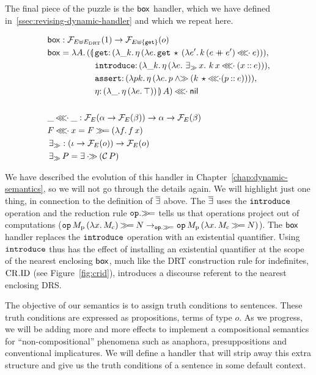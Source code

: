 The final piece of the puzzle is the $\mathsf{box}$ handler, which we have defined
in~\ref{ssec:revising-dynamic-handler} and which we repeat here.

\begin{align*}
  &\BOX :\FF_{E \uplus E_\DRT}(1) \to \FF_{E \uplus \{\op{get}\}}(o) \\
  &\BOX = \lam{A}{(\ap{\begin{aligned}[t]\lban
  &\onto{\op{get}}{(\lam{\_ k}{\etaE{(\lam{e}{\app{\op{get}}{\star}{(\lam{e'}{\ap{k}{(e \cat e')} \apll e})}})}})}, \\
  &\onto{\op{introduce}}{(\lam{\_ k}{\etaE{(\lam{e}{\existsr x.\ \ap{k}{x} \apll (x \cons e)})}})}, \\
  &\onto{\op{assert}}{(\lam{p k}{\etaE{(\lam{e}{p \andr (\ap{k}{\star} \apll (p \cons e))})}})}, \\
  &\onto{\eta}{(\lam{\_}{\etaE{(\lam{e}{\top})}})}\rban}{A}) \apll \nil
    \end{aligned}} \\
  \\
  &\_ \apll \_ : \FF_E(\alpha \to \FF_E(\beta)) \to \alpha \to \FF_E(\beta) \\
  &F \apll x = F \hsbind (\lam{f}{\ap{f}{x}}) \\
  &\existsr : (\iota \to \FF_E(o)) \to  \FF_E(o) \\
  &\existsr P = \exists \apr (\ap{\CC}{P})
\end{align*}

We have described the evolution of this handler in
Chapter~\ref{chap:dynamic-semantics}, so we will not go through the details
again. We will highlight just one thing, in connection to the definition of
$\mathop{\overline{\exists}}$ above. The $\mathop{\overline{\exists}}$ uses the $\mathtt{introduce}$ operation and
the reduction rule $\mathtt{op}.\mathbin{\gg\!=}$ tells us that operations project out
of computations
($\mathtt{op}\,M_{\mathrm{p}}\,(\lambda x.\, M_{\mathrm{c}}) \mathbin{\gg\!=} N
\to_{\mathtt{op}.\mathbin{\gg\!=}} \mathtt{op}\,M_{\mathrm{p}}\,(\lambda x.\, M_{\mathrm{c}} \mathbin{\gg\!=}
    N)$). The $\mathsf{box}$ handler replaces the $\mathtt{introduce}$ operation with
an existential quantifier. Using $\mathtt{introduce}$ thus has the effect of
installing an existential quantifier at the scope of the nearest enclosing
$\mathsf{box}$, much like the DRT construction rule for indefinites, $\mathrm{CR.ID}$ (see
Figure~\ref{fig:crid}), introduces a discourse referent to the nearest
enclosing DRS.

The objective of our semantics is to assign truth conditions to sentences. These
truth conditions are expressed as propositions, terms of type $o$. As we
progress, we will be adding more and more effects to implement a compositional
semantics for ``non-compositional'' phenomena such as anaphora, presuppositions
and conventional implicatures. We will define a handler that will strip away
this extra structure and give us the truth conditions of a sentence in some
default context.

